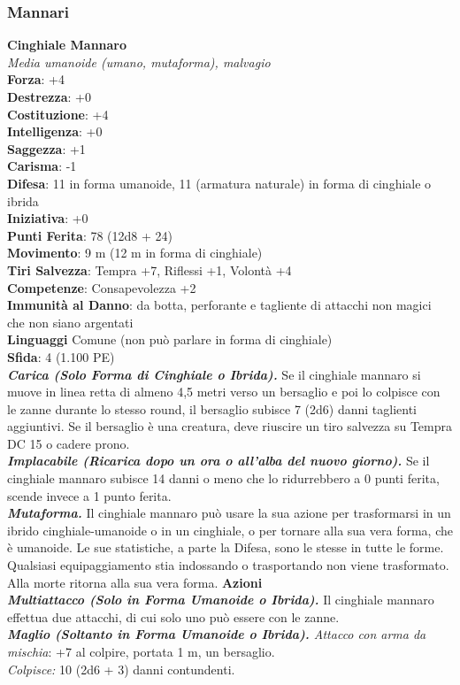\begin{multicols}{2}
\subsubsection{Mannari}

\medskip\textbf{Cinghiale Mannaro}\\
\emph{Media umanoide (umano, mutaforma), malvagio} \\
\textbf{Forza}: +4\\
\textbf{Destrezza}: +0\\
\textbf{Costituzione}: +4\\
\textbf{Intelligenza}: +0\\
\textbf{Saggezza}: +1\\
\textbf{Carisma}: -1\\
\textbf{Difesa}: 11 in forma umanoide, 11 (armatura naturale) in forma di cinghiale o ibrida\\ \textbf{Iniziativa}: +0\\
\textbf{Punti Ferita}: 78 (12d8 + 24)\\
\textbf{Movimento}: 9 m (12 m in forma di cinghiale)\\
\textbf{Tiri Salvezza}: Tempra +7, Riflessi +1, Volontà +4\\
\textbf{Competenze}: Consapevolezza +2\\
\textbf{Immunità al Danno}: da botta, perforante e tagliente di attacchi non magici che non siano argentati\\
\textbf{Linguaggi} Comune (non può parlare in forma di cinghiale)\\
\textbf{Sfida}: 4 (1.100 PE)\smallskip\\
\emph{\textbf{Carica (Solo Forma di Cinghiale o Ibrida).}} Se il cinghiale mannaro si muove in linea retta di almeno 4,5 metri verso un bersaglio e poi lo colpisce con le zanne durante lo stesso round, il bersaglio subisce 7 (2d6) danni taglienti aggiuntivi. Se il bersaglio è una creatura, deve riuscire un tiro salvezza su Tempra DC  15 o cadere prono.\\
\emph{\textbf{Implacabile (Ricarica dopo un ora o all'alba del nuovo giorno).}} Se il cinghiale mannaro subisce 14 danni o meno che lo ridurrebbero a 0 punti ferita, scende invece a 1 punto ferita.\\
\emph{\textbf{Mutaforma.}} Il cinghiale mannaro può usare la sua azione per trasformarsi in un ibrido cinghiale-umanoide o in un cinghiale, o per tornare alla sua vera forma, che è umanoide. Le sue statistiche, a parte la Difesa, sono le stesse in tutte le forme. Qualsiasi equipaggiamento stia indossando o trasportando non viene trasformato. Alla morte ritorna alla sua vera forma.
\smallskip\textbf{Azioni}\\
\emph{\textbf{Multiattacco (Solo in Forma Umanoide o Ibrida).}} Il cinghiale mannaro effettua due attacchi, di cui solo uno può essere con le zanne.\\
\emph{\textbf{Maglio (Soltanto in Forma Umanoide o Ibrida).} Attacco con arma da mischia}: +7 al colpire, portata 1 m, un bersaglio. \\
\emph{Colpisce:} 10 (2d6 + 3) danni contundenti.\\


\end{multicols}
